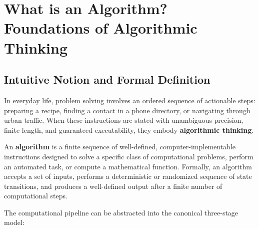\documentclass[11pt,a4paper]{article}
\begin{document}
\tableofcontents
\newpage

\section{What is an Algorithm? Foundations of Algorithmic Thinking}

\subsection{Intuitive Notion and Formal Definition}
In everyday life, problem solving involves an ordered sequence of actionable steps: preparing a recipe, finding a contact in a phone directory, or navigating through urban traffic. When these instructions are stated with unambiguous precision, finite length, and guaranteed executability, they embody \textbf{algorithmic thinking}.

\begin{definitionbox}
An \textbf{algorithm} is a finite sequence of well-defined, computer-implementable instructions designed to solve a specific class of computational problems, perform an automated task, or compute a mathematical function. Formally, an algorithm accepts a set of inputs, performs a deterministic or randomized sequence of state transitions, and produces a well-defined output after a finite number of computational steps.
\end{definitionbox}

The computational pipeline can be abstracted into the canonical three-stage model:
\begin{center}
\end{center}
\end{document}
